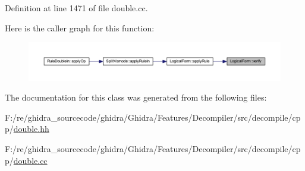 Definition at line 1471 of file double.\+cc.

Here is the caller graph for this function\+:
\nopagebreak
\begin{figure}[H]
\begin{center}
\leavevmode
\includegraphics[width=350pt]{class_logical_form_a1f37791de1ba99923bd526c18f945a2f_icgraph}
\end{center}
\end{figure}


The documentation for this class was generated from the following files\+:\begin{DoxyCompactItemize}
\item 
F\+:/re/ghidra\+\_\+sourcecode/ghidra/\+Ghidra/\+Features/\+Decompiler/src/decompile/cpp/\mbox{\hyperlink{double_8hh}{double.\+hh}}\item 
F\+:/re/ghidra\+\_\+sourcecode/ghidra/\+Ghidra/\+Features/\+Decompiler/src/decompile/cpp/\mbox{\hyperlink{double_8cc}{double.\+cc}}\end{DoxyCompactItemize}
